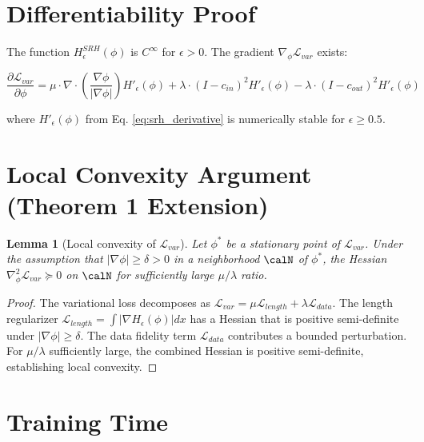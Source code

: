 \documentclass[12pt, a4paper]{article}
\newtheorem{lemma}{Lemma}
\newcommand{\calL}{\mathcal{L}}
\begin{document}
\appendix

\section{Differentiability Proof}
\label{app:differentiability}

The function $H_\epsilon^{SRH}(\phi)$ is $C^\infty$ for $\epsilon > 0$. The gradient $\nabla_\phi \calL_{var}$ exists:

\begin{equation}
\frac{\partial \calL_{var}}{\partial \phi} = \mu \cdot \nabla \cdot \left( \frac{\nabla \phi}{|\nabla \phi|} \right) H'_\epsilon(\phi) + \lambda \cdot (I - c_{in})^2 H'_\epsilon(\phi) - \lambda \cdot (I - c_{out})^2 H'_\epsilon(\phi)
\end{equation}

where $H'_\epsilon(\phi)$ from Eq. \ref{eq:srh_derivative} is numerically stable for $\epsilon \geq 0.5$.

\section{Local Convexity Argument (Theorem 1 Extension)}
\label{app:convexity}

\begin{lemma}[Local convexity of $\calL_{var}$]
Let $\phi^*$ be a stationary point of $\calL_{var}$. Under the assumption that $|\nabla \phi| \geq \delta > 0$ in a neighborhood $\calN$ of $\phi^*$, the Hessian $\nabla^2_\phi \calL_{var} \succeq 0$ on $\calN$ for sufficiently large $\mu/\lambda$ ratio.
\end{lemma}

\begin{proof}
The variational loss decomposes as $\calL_{var} = \mu \calL_{length} + \lambda \calL_{data}$. The length regularizer $\calL_{length} = \int |\nabla H_\epsilon(\phi)| dx$ has a Hessian that is positive semi-definite under $|\nabla \phi| \geq \delta$. The data fidelity term $\calL_{data}$ contributes a bounded perturbation. For $\mu/\lambda$ sufficiently large, the combined Hessian is positive semi-definite, establishing local convexity.
\end{proof}

\section{Training Time}
\label{app:training_time}
\end{document}
